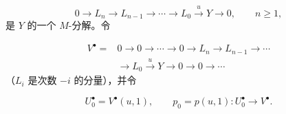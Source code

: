 \[
0\longrightarrow L_n\longrightarrow L_{n-1}\longrightarrow\cdots
\longrightarrow L_0\xrightarrow{u}Y\longrightarrow0,
\qquad n\geq1,
\]
是 $Y$ 的一个 $M$-分解。令

\[
\begin{aligned}
V^\bullet={}&0\longrightarrow0\longrightarrow\cdots\longrightarrow0
\longrightarrow L_n\longrightarrow L_{n-1}\longrightarrow\cdots\\
&\longrightarrow L_0\xrightarrow{u}Y\longrightarrow0
\longrightarrow0\longrightarrow\cdots
\end{aligned}
\]
（$L_i$ 是次数 $-i$ 的分量），并令

\[
U_0^\bullet=V^\bullet(u,1),
\qquad
p_0=p(u,1)\colon U_0^\bullet\longrightarrow V^\bullet.
\]
\endgroup
